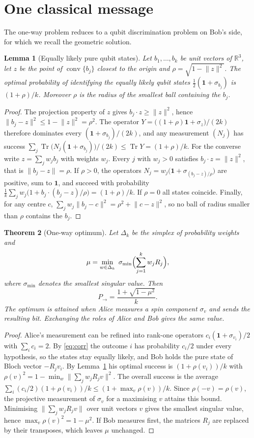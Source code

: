 \documentclass[11pt,a4paper]{article}
\newtheorem{theorem}{Theorem}
\newtheorem{lemma}[theorem]{Lemma}
\theoremstyle{definition}
\theoremstyle{plain}
\DeclareMathOperator{\Tr}{Tr}
\DeclareMathOperator{\conv}{conv}
\newcommand{\norm}[1]{\lVert#1\rVert}
\newcommand{\one}{\mathbf{1}}
\newcommand{\R}{\mathbb{R}}
\newcommand{\Pow}{P_{\to}}
\begin{document}
\section{One classical message}\label{sec:oneway}
The one-way problem reduces to a qubit discrimination problem on Bob's side,
for which we recall the geometric solution.

\begin{lemma}[Equally likely pure qubit states]\label{lem:qubit}
Let $b_1,\dots,b_k$ be unit vectors of $\R^3$, let $z$ be the point of
$\conv\{b_j\}$ closest to the origin and $\rho=\sqrt{1-\norm z^2}$. The
optimal probability of identifying the equally likely qubit states
$\tfrac12(\one+\sigma_{b_j})$ is $(1+\rho)/k$. Moreover $\rho$ is the radius
of the smallest ball containing the $b_j$.
\end{lemma}
\begin{proof}
The projection property of $z$ gives $b_j\cdot z\ge\norm z^2$, hence
$\norm{b_j-z}^2\le1-\norm z^2=\rho^2$. The operator
$Y=\bigl((1+\rho)\one+\sigma_z\bigr)/(2k)$ therefore dominates every
$(\one+\sigma_{b_j})/(2k)$, and any measurement $(N_j)$ has success
$\sum_j\Tr\bigl(N_j(\one+\sigma_{b_j})\bigr)/(2k)\le\Tr Y=(1+\rho)/k$. For
the converse write $z=\sum_jw_jb_j$ with weights $w_j$. Every $j$ with
$w_j>0$ satisfies $b_j\cdot z=\norm z^2$, that is $\norm{b_j-z}=\rho$. If
$\rho>0$, the operators $N_j=w_j\bigl(\one+\sigma_{(b_j-z)/\rho}\bigr)$ are
positive, sum to $\one$, and succeed with probability
$\frac1k\sum_jw_j\bigl(1+b_j\cdot(b_j-z)/\rho\bigr)=(1+\rho)/k$. If
$\rho=0$ all states coincide. Finally, for any centre $c$,
$\sum_jw_j\norm{b_j-c}^2=\rho^2+\norm{c-z}^2$, so no ball of radius smaller
than $\rho$ contains the $b_j$.
\end{proof}

\begin{theorem}[One-way optimum]\label{thm:oneway}
Let $\Delta_k$ be the simplex of probability weights and
\[
\mu=\min_{w\in\Delta_k}\ \sigma_{\min}\Bigl(\sum_{j=1}^kw_jR_j\Bigr),
\]
where $\sigma_{\min}$ denotes the smallest singular value. Then
\[
\Pow=\frac{1+\sqrt{1-\mu^2}}{k}.
\]
The optimum is attained when Alice measures a spin component $\sigma_v$ and
sends the resulting bit. Exchanging the roles of Alice and Bob gives the same
value.
\end{theorem}
\begin{proof}
Alice's measurement can be refined into rank-one operators
$c_i(\one+\sigma_{v_i})/2$ with $\sum_ic_i=2$. By \eqref{eq:corr} the outcome
$i$ has probability $c_i/2$ under every hypothesis, so the states stay equally
likely, and Bob holds the pure state of Bloch vector $-R_jv_i$. By
Lemma~\ref{lem:qubit} his optimal success is $(1+\rho(v_i))/k$ with
$\rho(v)^2=1-\min_w\norm{\sum_jw_jR_jv}^2$. The overall success is the average
$\sum_i(c_i/2)(1+\rho(v_i))/k\le(1+\max_v\rho(v))/k$. Since
$\rho(-v)=\rho(v)$, the projective measurement of $\sigma_v$ for a maximising
$v$ attains this bound. Minimising $\norm{\sum_jw_jR_jv}$ over unit vectors
$v$ gives the smallest singular value, hence $\max_v\rho(v)^2=1-\mu^2$. If
Bob measures first, the matrices $R_j$ are replaced by their transposes, which
leaves $\mu$ unchanged.
\end{proof}
\end{document}

